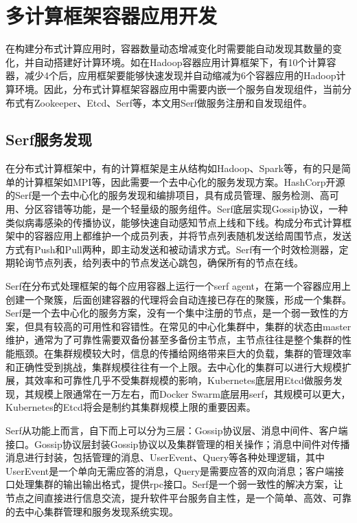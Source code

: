 \section{多计算框架容器应用开发}
在构建分布式计算应用时，容器数量动态增减变化时需要能自动发现其数量的变化，并自动搭建好计算环境。如在Hadoop容器应用计算框架下，有10个计算容器，减少4个后，应用框架要能够快速发现并自动缩减为6个容器应用的Hadoop计算环境。因此，分布式计算框架容器应用中需要内嵌一个服务自发现组件，当前分布式有Zookeeper、Etcd、Serf等，本文用Serf做服务注册和自发现组件。

\subsection{Serf服务发现}
在分布式计算框架中，有的计算框架是主从结构如Hadoop、Spark等，有的只是简单的计算框架如MPI等，因此需要一个去中心化的服务发现方案。HashCorp开源的Serf是一个去中心化的服务发现和编排项目，具有成员管理、服务检测、高可用、分区容错等功能，是一个轻量级的服务组件。Serf底层实现Gossip协议，一种类似病毒感染的传播协议，能够快速自动感知节点上线和下线。构成分布式计算框架中的容器应用上都维护一个成员列表，并将节点列表随机发送给周围节点，发送方式有Push和Pull两种，即主动发送和被动请求方式。Serf有一个时效检测器，定期轮询节点列表，给列表中的节点发送心跳包，确保所有的节点在线。

Serf在分布式处理框架的每个应用容器上运行一个serf agent，在第一个容器应用上创建一个聚簇，后面创建容器的代理将会自动连接已存在的聚簇，形成一个集群。Serf是一个去中心化的服务方案，没有一个集中注册的节点，是一个弱一致性的方案，但具有较高的可用性和容错性。在常见的中心化集群中，集群的状态由master维护，通常为了可靠性需要双备份甚至多备份主节点，主节点往往是整个集群的性能瓶颈。在集群规模较大时，信息的传播给网络带来巨大的负载，集群的管理效率和正确性受到挑战，集群规模往往有一个上限。去中心化的集群可以进行大规模扩展，其效率和可靠性几乎不受集群规模的影响，Kubernetes底层用Etcd做服务发现，其规模上限通常在一万左右，而Docker Swarm底层用serf，其规模可以更大，Kubernetes的Etcd将会是制约其集群规模上限的重要因素。

Serf从功能上而言，自下而上可以分为三层：Gossip协议层、消息中间件、客户端接口。Gossip协议层封装Gossip协议以及集群管理的相关操作；消息中间件对传播消息进行封装，包括管理的消息、UserEvent、Query等各种处理逻辑，其中UserEvent是一个单向无需应答的消息，Query是需要应答的双向消息；客户端接口处理集群的输出输出格式，提供rpc接口。Serf是一个弱一致性的解决方案，让节点之间直接进行信息交流，提升软件平台服务自主性，是一个简单、高效、可靠的去中心集群管理和服务发现系统实现。

